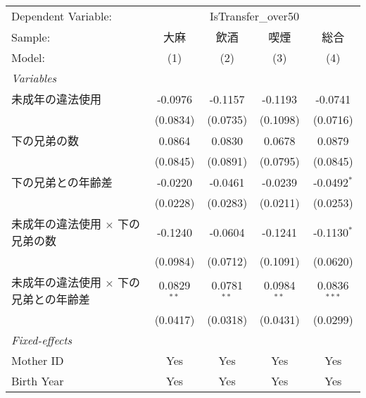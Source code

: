 \documentclass{article}
\begin{document}
\begin{landscape}


\begingroup
\centering
\begin{threeparttable}[b]
   \begin{tabular}{lcccc}
      \tabularnewline \midrule \midrule
      Dependent Variable: & \multicolumn{4}{c}{IsTransfer\_over50}\\
      Sample:                                       & 大麻          & 飲酒          & 喫煙          & 総合 \\   
      Model:                                        & (1)           & (2)           & (3)           & (4)\\  
      \midrule
      \emph{Variables}\\
      未成年の違法使用                              & -0.0976       & -0.1157       & -0.1193       & -0.0741\\   
                                                    & (0.0834)      & (0.0735)      & (0.1098)      & (0.0716)\\   
      下の兄弟の数                                  & 0.0864        & 0.0830        & 0.0678        & 0.0879\\   
                                                    & (0.0845)      & (0.0891)      & (0.0795)      & (0.0845)\\   
      下の兄弟との年齢差                            & -0.0220       & -0.0461       & -0.0239       & -0.0492$^{*}$\\   
                                                    & (0.0228)      & (0.0283)      & (0.0211)      & (0.0253)\\   
      未成年の違法使用 $\times$ 下の兄弟の数        & -0.1240       & -0.0604       & -0.1241       & -0.1130$^{*}$\\   
                                                    & (0.0984)      & (0.0712)      & (0.1091)      & (0.0620)\\   
      未成年の違法使用 $\times$ 下の兄弟との年齢差  & 0.0829$^{**}$ & 0.0781$^{**}$ & 0.0984$^{**}$ & 0.0836$^{***}$\\   
                                                    & (0.0417)      & (0.0318)      & (0.0431)      & (0.0299)\\   
      \midrule
      \emph{Fixed-effects}\\
      Mother ID                                     & Yes           & Yes           & Yes           & Yes\\  
      Birth Year                                    & Yes           & Yes           & Yes           & Yes\\  

\end{tabular}
\end{threeparttable}
\end{landscape}
\end{document}
